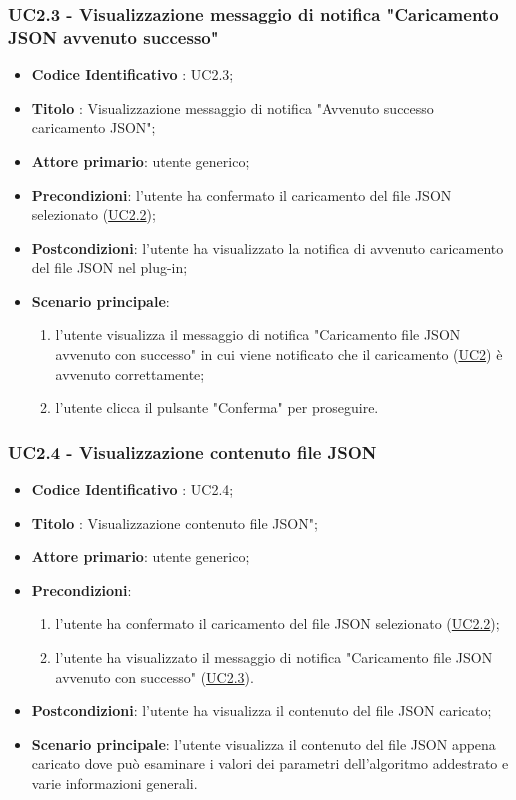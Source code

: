 		\label{par:UC2.3}
	\subsubsection{UC2.3 - Visualizzazione messaggio di notifica "Caricamento JSON avvenuto successo"}
		\begin{itemize}
			\item\textbf{Codice Identificativo} : UC2.3;
			\item\textbf{Titolo} : Visualizzazione messaggio di notifica "Avvenuto successo caricamento JSON";
			\item\textbf{Attore primario}: utente generico;
			\item\textbf{Precondizioni}: l'utente ha confermato il caricamento del file JSON selezionato (\hyperref[par:UC2.2]{UC2.2});
			\item\textbf{Postcondizioni}: l'utente ha visualizzato la notifica di avvenuto caricamento del file JSON nel plug-in;
			\item\textbf{Scenario principale}:
				\begin{enumerate}
					\item l'utente visualizza il messaggio di notifica "Caricamento file JSON avvenuto con successo" in cui viene notificato che il caricamento (\hyperref[par:UC2]{UC2}) è avvenuto correttamente;
					\item l'utente clicca il pulsante "Conferma" per proseguire.		
				\end{enumerate}		
		\end{itemize}
		
		\label{par:UC2.4}
	\subsubsection{UC2.4 - Visualizzazione contenuto file JSON}
		\begin{itemize}
			\item\textbf{Codice Identificativo} : UC2.4;
			\item\textbf{Titolo} : Visualizzazione contenuto file JSON";
			\item\textbf{Attore primario}: utente generico;
			\item\textbf{Precondizioni}: 
				\begin{enumerate}
					\item l'utente ha confermato il caricamento del file JSON selezionato (\hyperref[par:UC2.2]{UC2.2});
					\item l'utente ha visualizzato il messaggio di notifica "Caricamento file JSON avvenuto con successo" (\hyperref[par:UC2.3]{UC2.3}).
				\end{enumerate}
			\item\textbf{Postcondizioni}: l'utente ha visualizza il contenuto del file JSON caricato;
			\item\textbf{Scenario principale}: l'utente visualizza il contenuto del file JSON appena caricato dove può esaminare i valori dei parametri dell'algoritmo addestrato e varie informazioni generali.
		\end{itemize}

